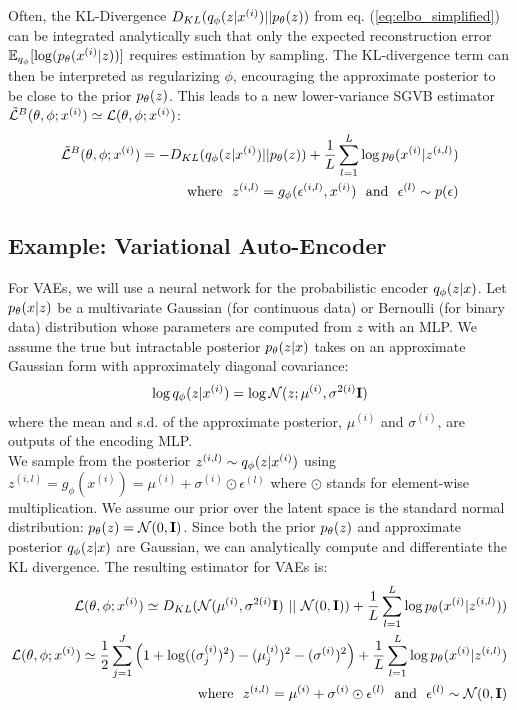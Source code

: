 \documentclass{article}
\begin{document}
Often, the KL-Divergence $D_{KL}(q_\phi(z|x^{(i)})||p_\theta(z))$ from eq. (\ref{eq:elbo_simplified}) can be integrated analytically such that only the expected reconstruction error $\mathbb{E}_{q_\phi}[\log (p_\theta(x^{(i)}|z))]$ requires estimation by sampling. The KL-divergence term can then be interpreted as regularizing $\phi$, encouraging the approximate posterior to be close to the prior $p_\theta(z)$. This leads to a new lower-variance SGVB estimator $\tilde{\mathcal{L}}^B(\theta,\phi;x^{(i)})\simeq\mathcal{L}(\theta,\phi;x^{(i)})$:
\begin{align}
    \tilde{\mathcal{L}}^B(\theta,\phi;x^{(i)}) = -D_{KL}(q_\phi(z|x^{(i)})||p_\theta(z)) + \frac{1}{L}\sum_{l=1}^L\log p_\theta(x^{(i)}|z^{(i,l)}) 
    \notag \\
    \text{where~~} z^{(i,l)} = g_\phi(\epsilon^{(i,l)},x^{(i)}) \text{~~and~~} \epsilon^{(l)}\sim p(\epsilon)
\end{align}

\subsection{Example: Variational Auto-Encoder}
For VAEs, we will use a neural network for the probabilistic encoder $q_\phi(z|x)$. Let $p_\theta(x|z)$ be a multivariate Gaussian (for continuous data) or Bernoulli (for binary data) distribution whose parameters are computed from $z$ with an MLP. We assume the true but intractable posterior $p_\theta(z|x)$ takes on an approximate Gaussian form with approximately diagonal covariance:
\begin{align}
    \log q_\phi(z|x^{(i)}) = \log\mathcal{N}(z;\mu^{(i)},\sigma^{2(i)}\mathbf{I})
\end{align}
where the mean and s.d. of the approximate posterior, $\mu^{(i)}$
and $\sigma^{(i)}$, are outputs of the encoding MLP. \\
We sample from the posterior $z^{(i,l)}\sim q_\phi(z|x^{(i)})$ using $z^{(i,l)} = g_\phi(x^{(i)}) = \mu^{(i)} + \sigma^{(i)} \odot \epsilon^{(l)}$ where $\odot$ stands for element-wise multiplication. We assume our prior over the latent space is the standard normal distribution: $p_\theta(z)=\mathcal{N}(0,\mathbf{I})$. Since both the prior $p_\theta(z)$ and approximate posterior $q_\phi(z|x)$ are Gaussian, we can analytically compute and differentiate the KL divergence. The resulting estimator for VAEs is:
\begin{align}
    \mathcal{L}(\theta,\phi;x^{(i)}) \simeq D_{KL}(\mathcal{N}(\mu^{(i)},\sigma^{2(i)}\mathbf{I})~||~\mathcal{N}(0,\mathbf{I})) + \frac{1}{L}\sum_{l=1}^L \log p_\theta(x^{(i)}|z^{(i,l)}))\\
    \mathcal{L}(\theta,\phi;x^{(i)}) \simeq \frac{1}{2}\sum_{j=1}^J\left(  1 + \log((\sigma_j^{(i)})^2)-(\mu_j^{(i)})^2 - (\sigma^{(i)})^2\right) + \frac{1}{L}\sum_{l=1}^L \log p_\theta(x^{(i)}|z^{(i,l)})\\
    \text{~~where~~} z^{(i,l)} = \mu^{(i)} + \sigma^{(i)} \odot \epsilon^{(l)} \text{~~and~~} \epsilon^{(l)}\sim\mathcal{N}(0,\mathbf{I}) \notag
\end{align}
\end{document}
